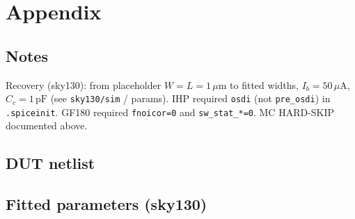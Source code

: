 \documentclass[11pt]{article}
\begin{document}
\section{Appendix}
\subsection{Notes}
Recovery (sky130): from placeholder \(W=L=1\,\mu\mathrm{m}\) to fitted widths, \(I_b=50\,\mu\mathrm{A}\), \(C_c=1\,\mathrm{pF}\) (see \texttt{sky130/sim} / params).
IHP required \texttt{osdi} (not \texttt{pre\_osdi}) in \texttt{.spiceinit}.
GF180 required \texttt{fnoicor=0} and \texttt{sw\_stat\_*=0}.
MC HARD-SKIP documented above.

\subsection{DUT netlist}

\subsection{Fitted parameters (sky130)}

\end{document}
